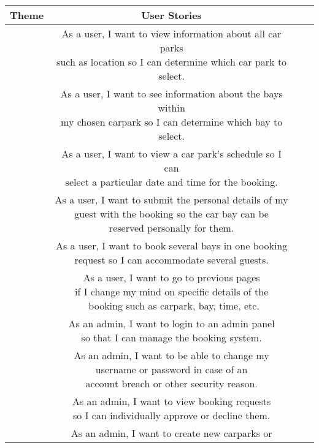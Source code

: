 \documentclass[a4paper, 10pt]{article}
\begin{document}
\begin{tabular}[hbt!]{|>{\centering\arraybackslash}m{7em}|c|c|c|}
    \hline
    Theme & User Stories \\
    \hline
    \multirow{6}{*}{Booking} & 
    \makecell{As a user, I want to view information about all car parks \\ 
    such as location so I can determine which car park to select.} \\
    \cline{2-2}
    & \makecell{As a user, I want to see information about the bays within \\
    my chosen carpark so I can determine which bay to select.} \\
    \cline{2-2}
    & \makecell{As a user, I want to view a car park’s schedule so I can \\ 
    select a particular date and time for the booking.} \\
    \cline{2-2}
    & \makecell{As a user, I want to submit the personal details of my \\ 
    guest with the booking so the car bay can be \\
    reserved personally for them.} \\
    \cline{2-2}
    & \makecell{As a user, I want to book several bays in one booking \\
    request so I can accommodate several guests.} \\
    \cline{2-2}
    & \makecell{As a user, I want to go to previous pages \\
    if I change my mind on specific details of the \\\
    booking such as carpark, bay, time, etc.} \\
    \hline
    \multirow{2}{*}{Authentication} & 
    \makecell{As an admin, I want to login to an admin panel \\ 
    so that I can manage the booking system.} \\
    \cline{2-2}
    & \makecell{As an admin, I want to be able to change my \\ 
    username or password in case of an \\
    account breach or other security reason.} \\
    \cline{2-2}
    \hline
    \multirow{6}{*}{Admin Panel} & 
    \makecell{As an admin, I want to view booking requests \\
    so I can individually approve or decline them.} \\
    \cline{2-2}
    & \makecell{As an admin, I want to create new carparks or \\
}
\end{tabular}
\end{document}
